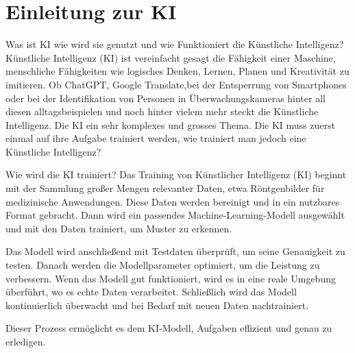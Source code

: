 \section{Einleitung zur KI}
\label{sec:ai}

Was ist KI wie wird sie genutzt und wie Funktioniert die Künstliche Intelligenz?
Künstliche Intelligenz (KI) ist vereinfacht gesagt die Fähigkeit einer Maschine, menschliche Fähigkeiten wie logisches Denken, Lernen, Planen und Kreativität zu imitieren.
Ob ChatGPT, Google Translate,bei der Entsperrung von Smartphones oder bei der Identifikation von Personen in Überwachungskameras hinter all diesen alltagsbeispielen und noch hinter vielem mehr steckt die Künstliche Intelligenz. Die KI ein sehr komplexes und grosses Thema. Die KI muss zuerst einmal auf ihre Aufgabe trainiert werden, wie trainiert man jedoch eine Künstliche Intelligenz?

Wie wird die KI trainiert?
Das Training von Künstlicher Intelligenz (KI) beginnt mit der Sammlung großer Mengen relevanter Daten, etwa Röntgenbilder für medizinische Anwendungen. Diese Daten werden bereinigt und in ein nutzbares Format gebracht. Dann wird ein passendes Machine-Learning-Modell ausgewählt und mit den Daten trainiert, um Muster zu erkennen.

Das Modell wird anschließend mit Testdaten überprüft, um seine Genauigkeit zu testen. Danach werden die Modellparameter optimiert, um die Leistung zu verbessern. Wenn das Modell gut funktioniert, wird es in eine reale Umgebung überführt, wo es echte Daten verarbeitet. Schließlich wird das Modell kontinuierlich überwacht und bei Bedarf mit neuen Daten nachtrainiert.

Dieser Prozess ermöglicht es dem KI-Modell, Aufgaben effizient und genau zu erledigen. 